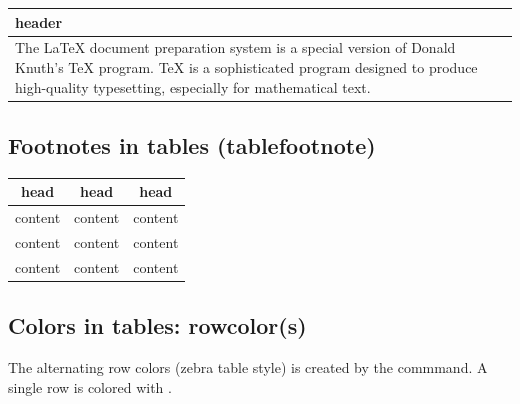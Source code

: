 \begin{filecontents*}{\democodefile}
\begin{center}
\small\centering\renewcommand{\arraystretch}{1.4}  
\begin{tabularx}{\textwidth}{|X|}
\hline
   \centering header \tabularnewline
\hline
%
The \LaTeX{} document preparation system is a special version of Donald
Knuth's \TeX{} program\tablefootnote{first footnote in table}. 
\TeX{} is a sophisticated program designed to produce high-quality
typesetting, especially for mathematical text\tablefootnote{second footnote in table}.
\tabularnewline
\hline
\end{tabularx}
\end{center}
\end{filecontents*}

\subsection{Footnotes in tables (tablefootnote)}
\label{sec:tableFootnotes}

%


\begin{filecontents*}{\democodefile}
\begin{center}
\small\sffamily\renewcommand{\arraystretch}{1.4}  
\begin{tabular}{ccc}
\hline
\rowcolor{tableheadcolor}
head & head & head \\
\hline
content & content & content \\
content & content & content \\
content & content & content \\
\hline
\end{tabular}
\end{center}	
\end{filecontents*}

\subsection{Colors in tables: rowcolor(s)}
\label{sec:tablecolors}
The alternating row colors (zebra table style) is created by the  commmand. A single row is colored with .

